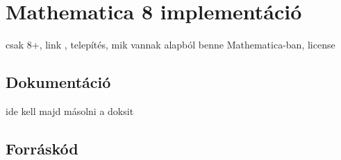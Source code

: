 \section{Mathematica 8 implementáció}
csak 8+, link \cite{Nag11}, telepítés, mik vannak alapból benne Mathematica-ban, license

\subsection{Dokumentáció}
ide kell majd másolni a doksit

\subsection{Forráskód}
\lstset{
	language=Mathematica,
	tabsize=2,
	breaklines=true,
	showstringspaces=false,
	basicstyle=\footnotesize,
	numbers=left,
	numberstyle=\footnotesize
}

